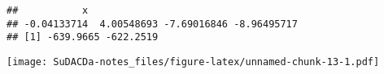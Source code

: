 \documentclass[]{book}
\newenvironment{Shaded}{\begin{snugshade}}{\end{snugshade}}
\newcommand{\KeywordTok}[1]{\textcolor[rgb]{0.13,0.29,0.53}{\textbf{{#1}}}}
\newcommand{\DataTypeTok}[1]{\textcolor[rgb]{0.13,0.29,0.53}{{#1}}}
\newcommand{\DecValTok}[1]{\textcolor[rgb]{0.00,0.00,0.81}{{#1}}}
\newcommand{\StringTok}[1]{\textcolor[rgb]{0.31,0.60,0.02}{{#1}}}
\newcommand{\NormalTok}[1]{{#1}}
\theoremstyle{definition}
\theoremstyle{definition}
\theoremstyle{definition}
\theoremstyle{remark}
\begin{document}
\begin{Shaded}
\end{Shaded}

\begin{verbatim}
##           x                                     
## -0.04133714  4.00548693 -7.69016846 -8.96495717 
## [1] -639.9665 -622.2519
\end{verbatim}

\texttt{[image: SuDACDa-notes\_files/figure-latex/unnamed-chunk-13-1.pdf]}
\end{document}
